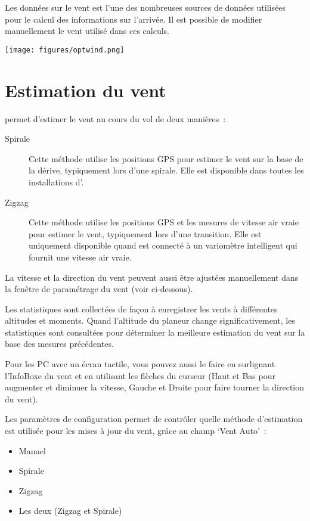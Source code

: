 Les données sur le vent est l'une des nombreuses sources de données utilisées pour le calcul des informations sur l'arrivée.
Il est possible de modifier manuellement le vent utilisé dans ces calculs.

\begin{center}
\texttt{[image: figures/optwind.png]}


\end{center}

\section{Estimation du vent}\label{sec:wind-estimation}

\xc{} permet d'estimer le vent au cours du vol de deux manières~:
\begin{description}
\item[Spirale] Cette méthode utilise les positions GPS pour estimer le vent sur la base de la dérive, typiquement lors d'une spirale.
Elle est disponible dans toutes les installations d'\xc.
\item[Zigzag] Cette méthode utilise les positions GPS et les mesures de vitesse air vraie pour estimer le vent, typiquement lors d'une transition.
Elle est uniquement disponible quand \xc{} est connecté à un variomètre intelligent qui fournit une vitesse air vraie.
\end{description}

La vitesse et la direction du vent peuvent aussi être ajustées manuellement dans la fenêtre de paramétrage du vent (voir ci-dessous).

Les statistiques sont collectées de façon à enregistrer les vents à différentes altitudes et moments.
Quand l'altitude du planeur change significativement, les statistiques sont consultées pour déterminer la meilleure estimation du vent sur la base des mesures précédentes.

Pour les PC avec un écran tactile, vous pouvez aussi le faire en surlignant l'InfoBoxe du vent et en utilisant les flèches du curseur (Haut et Bas pour augmenter et diminuer la vitesse, Gauche et Droite pour faire tourner la direction du vent).

Les paramètres de configuration  permet de contrôler quelle méthode d'estimation est utilisée pour les mises à jour du vent, grâce au champ `Vent Auto'~:
\begin{itemize}
\item Manuel
\item Spirale
\item Zigzag
\item Les deux (Zigzag et Spirale)
\end{itemize}

